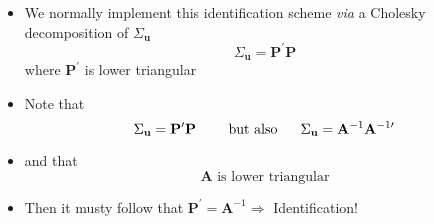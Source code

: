 \documentclass[10pt,handout]{beamer}
\begin{document}
\vspace{0.1cm}

\begin{frame}
\begin{itemize}
\item We normally implement this identification scheme \emph{via} a {{%
\color{red} Cholesky decomposition}} of $\Sigma _{\mathbf{u}}$%
\begin{equation*}
\Sigma _{\mathbf{u}}=\mathbf{P}^{\prime }\mathbf{P}
\end{equation*}%
where $\mathbf{P}^{\prime }$ is lower triangular\bigskip \pause

\item Note that%
\begin{equation*}
\Sigma _{\mathbf{u}}=\mathbf{P}^{\prime }\mathbf{P}\text{ \ \ \ \ but also \
\ \ \ }\Sigma _{\mathbf{u}}=\mathbf{A}^{-1}\mathbf{A}^{-1\prime }
\end{equation*}

\item and that%
\begin{equation*}
\mathbf{A}\text{ is lower triangular}
\end{equation*}%
\pause

\item Then it musty follow that $\mathbf{P}^{\prime }\mathbf{=A}%
^{-1}\Longrightarrow $ Identification!
\end{itemize}
\end{frame}

\vspace{0.1cm}

\everymath\expandafter{\the\everymath \color{note!80}}
\everydisplay\expandafter{\the\everydisplay \color{note!80}}%
\end{document}
